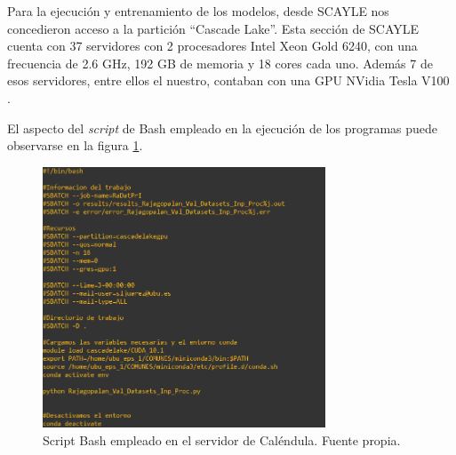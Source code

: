 Para la ejecución y entrenamiento de los modelos, desde SCAYLE nos concedieron acceso a la partición ``Cascade Lake''. Esta sección de SCAYLE cuenta con 37 servidores con 2 procesadores Intel Xeon Gold 6240, con una frecuencia de 2.6 GHz, 192 GB de memoria y 18 cores cada uno. Además 7 de esos servidores, entre ellos el nuestro, contaban con una GPU NVidia Tesla V100 \cite{scayle:cascadelake}.

El aspecto del \textit{script} de Bash empleado en la ejecución de los programas puede observarse en la figura \ref{fig:bash}.

\begin{figure}[h]
    \centering
    \includegraphics[width=0.75\textwidth]{img/bash.png}
    \caption{Script Bash empleado en el servidor de Caléndula. Fuente propia.}
    \label{fig:bash}
\end{figure}

